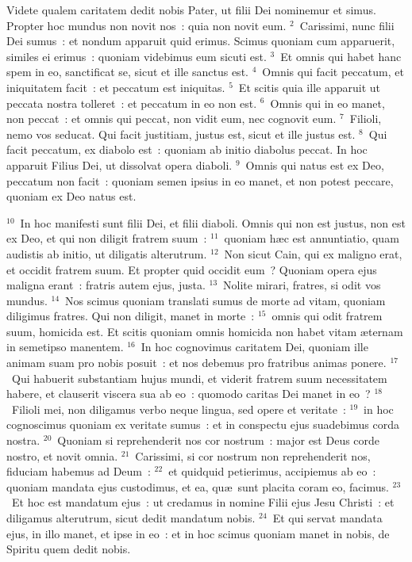 \lettrine[lines=3,image=true,loversize=0.05,lraise=-0.03]{V}{}idete qualem caritatem dedit nobis Pater, ut filii Dei nominemur et simus. Propter hoc mundus non novit nos~: quia non novit eum.
${}^{2}$~Carissimi, nunc filii Dei sumus~: et nondum apparuit quid erimus. Scimus quoniam cum apparuerit, similes ei erimus~: quoniam videbimus eum sicuti est.
${}^{3}$~Et omnis qui habet hanc spem in eo, sanctificat se, sicut et ille sanctus est.
${}^{4}$~Omnis qui facit peccatum, et iniquitatem facit~: et peccatum est iniquitas.
${}^{5}$~Et scitis quia ille apparuit ut peccata nostra tolleret~: et peccatum in eo non est.
${}^{6}$~Omnis qui in eo manet, non peccat~: et omnis qui peccat, non vidit eum, nec cognovit eum.
${}^{7}$~Filioli, nemo vos seducat. Qui facit justitiam, justus est, sicut et ille justus est.
${}^{8}$~Qui facit peccatum, ex diabolo est~: quoniam ab initio diabolus peccat. In hoc apparuit Filius Dei, ut dissolvat opera diaboli.
${}^{9}$~Omnis qui natus est ex Deo, peccatum non facit~: quoniam semen ipsius in eo manet, et non potest peccare, quoniam ex Deo natus est.


${}^{10}$~In hoc manifesti sunt filii Dei, et filii diaboli. Omnis qui non est justus, non est ex Deo, et qui non diligit fratrem suum~:
${}^{11}$~quoniam h\ae c est annuntiatio, quam audistis ab initio, ut diligatis alterutrum.
${}^{12}$~Non sicut Cain, qui ex maligno erat, et occidit fratrem suum. Et propter quid occidit eum~? Quoniam opera ejus maligna erant~: fratris autem ejus, justa.
${}^{13}$~Nolite mirari, fratres, si odit vos mundus.
${}^{14}$~Nos scimus quoniam translati sumus de morte ad vitam, quoniam diligimus fratres. Qui non diligit, manet in morte~:
${}^{15}$~omnis qui odit fratrem suum, homicida est. Et scitis quoniam omnis homicida non habet vitam \ae ternam in semetipso manentem.
${}^{16}$~In hoc cognovimus caritatem Dei, quoniam ille animam suam pro nobis posuit~: et nos debemus pro fratribus animas ponere.
${}^{17}$~Qui habuerit substantiam hujus mundi, et viderit fratrem suum necessitatem habere, et clauserit viscera sua ab eo~: quomodo caritas Dei manet in eo~?
${}^{18}$~Filioli mei, non diligamus verbo neque lingua, sed opere et veritate~:
${}^{19}$~in hoc cognoscimus quoniam ex veritate sumus~: et in conspectu ejus suadebimus corda nostra.
${}^{20}$~Quoniam si reprehenderit nos cor nostrum~: major est Deus corde nostro, et novit omnia.
${}^{21}$~Carissimi, si cor nostrum non reprehenderit nos, fiduciam habemus ad Deum~:
${}^{22}$~et quidquid petierimus, accipiemus ab eo~: quoniam mandata ejus custodimus, et ea, qu\ae\ sunt placita coram eo, facimus.
${}^{23}$~Et hoc est mandatum ejus~: ut credamus in nomine Filii ejus Jesu Christi~: et diligamus alterutrum, sicut dedit mandatum nobis.
${}^{24}$~Et qui servat mandata ejus, in illo manet, et ipse in eo~: et in hoc scimus quoniam manet in nobis, de Spiritu quem dedit nobis.


